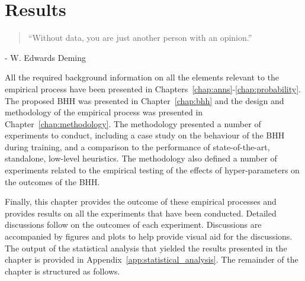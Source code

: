 \chapter{Results}
\label{chap:results}

\begin{quotation}
	\noindent ``Without data, you are just another person with an opinion.''
\end{quotation}
\begin{flushright}
	- W. Edwards Deming
\end{flushright}

\noindent
All the required background information on all the elements relevant to the empirical process have been presented in Chapters~\ref{chap:anns}-\ref{chap:probability}. The proposed \acf{BHH} was presented in Chapter~\ref{chap:bhh} and the design and methodology of the empirical process was presented in Chapter~\ref{chap:methodology}. The methodology presented a number of experiments to conduct, including a case study on the behaviour of the \acs{BHH} during training, and a comparison to the performance of state-of-the-art, standalone, low-level heuristics. The methodology also defined a number of experiments related to the empirical testing of the effects of hyper-parameters on the outcomes of the \acs{BHH}.

Finally, this chapter provides the outcome of these empirical processes and provides results on all the experiments that have been conducted. Detailed discussions follow on the outcomes of each experiment. Discussions are accompanied by figures and plots to help provide visual aid for the discussions. The output of the statistical analysis that yielded the results presented in the chapter is provided in Appendix~\ref{app:statistical_analysis}. The remainder of the chapter is structured as follows.

